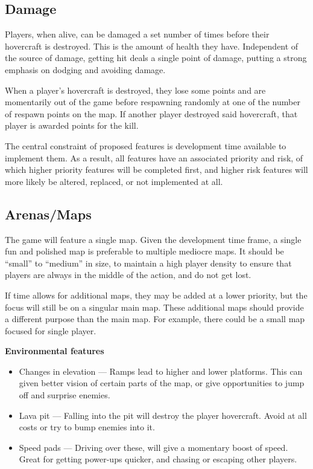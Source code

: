 \documentclass{article}
\theoremstyle{definition}
\begin{document}
\subsection{Damage}

Players, when alive, can be damaged a set number of times before their
hovercraft is destroyed. This is the amount of health they have. Independent of
the source of damage, getting hit deals a single point of damage, putting
a strong emphasis on dodging and avoiding damage.

When a player's hovercraft is destroyed, they lose some points and are
momentarily out of the game before respawning randomly at one of the number of
respawn points on the map. If another player destroyed said hovercraft, that
player is awarded points for the kill.

The central constraint of proposed features is development time available to
implement them. As a result, all features have an associated priority and risk,
of which higher priority features will be completed first, and higher risk
features will more likely be altered, replaced, or not implemented at all.


\subsection{Arenas/Maps}

The game will feature a single map. Given the development time frame, a single
fun and polished map is preferable to multiple mediocre maps. It should be
``small'' to ``medium'' in size, to maintain a high player density to ensure
that players are always in the middle of the action, and do not get lost.

If time allows for additional maps, they may be added at a lower priority, but
the focus will still be on a singular main map. These additional maps should
provide a different purpose than the main map. For example, there could be
a small map focused for single player.

\textbf{Environmental features}

\begin{itemize}
  \item Changes in elevation --- Ramps lead to higher and lower platforms. This
    can given better vision of certain parts of the map, or give opportunities
    to jump off and surprise enemies.
  \item Lava pit --- Falling into the pit will destroy the player hovercraft.
    Avoid at all costs or try to bump enemies into it.
  \item Speed pads --- Driving over these, will give a momentary boost of
    speed. Great for getting power-ups quicker, and chasing or escaping other
    players.
\end{itemize}
\end{document}
